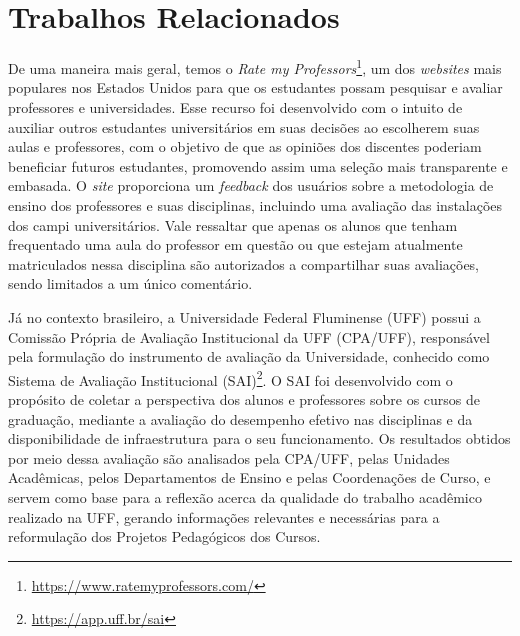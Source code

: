 
\section{Trabalhos Relacionados}
\label{sec:trab_relacionados}

De uma maneira mais geral, temos o 
\textit{Rate my Professors}\footnote{\url{https://www.ratemyprofessors.com/}}, 
um dos \textit{websites} mais populares nos Estados Unidos para que os estudantes possam pesquisar e avaliar professores e universidades. Esse recurso foi desenvolvido com o intuito de auxiliar outros estudantes universitários em suas decisões ao escolherem suas aulas e professores, com o objetivo de que as opiniões dos discentes poderiam beneficiar futuros estudantes, promovendo assim uma seleção mais transparente e embasada. O \textit{site} proporciona um \textit{feedback} dos usuários sobre a metodologia de ensino dos professores e suas disciplinas, incluindo uma avaliação das instalações dos campi universitários. Vale ressaltar que apenas os alunos que tenham frequentado uma aula do professor em questão ou que estejam atualmente matriculados nessa disciplina são autorizados a compartilhar suas avaliações, sendo limitados a um único comentário.


Já no contexto brasileiro, a Universidade Federal Fluminense (UFF) possui a Comissão Própria de Avaliação Institucional da UFF (CPA/UFF),
responsável pela formulação do instrumento de avaliação da Universidade, conhecido como Sistema de Avaliação Institucional (SAI)\footnote{\url{https://app.uff.br/sai}}.
O SAI foi desenvolvido com o propósito de coletar a perspectiva dos alunos e professores sobre os cursos de graduação,
mediante a avaliação do desempenho efetivo nas disciplinas e da disponibilidade de infraestrutura para o seu funcionamento.
Os resultados obtidos por meio dessa avaliação são analisados pela CPA/UFF, pelas Unidades Acadêmicas, pelos Departamentos de Ensino e pelas Coordenações de Curso,
e servem como base para a reflexão acerca da qualidade do trabalho acadêmico realizado na UFF, gerando informações relevantes e necessárias para a reformulação dos Projetos Pedagógicos dos Cursos.

